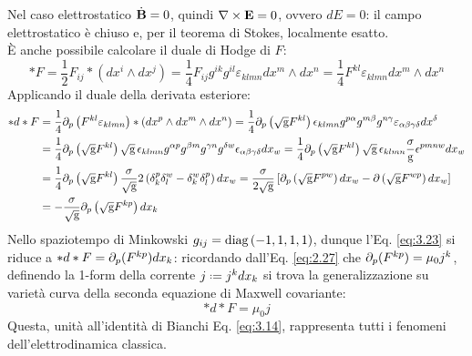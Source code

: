 Nel caso elettrostatico $ \dot{\mathbf{B}} = 0 $, quindi $ \nabla\times\mathbf{E} = 0 $, ovvero $ dE = 0 $: il campo elettrostatico è chiuso e, per il teorema di Stokes, localmente esatto.\\
È anche possibile calcolare il duale di Hodge di $ F $:
\begin{equation}
	*F = \frac{1}{2}F_{ij} * \left( dx^i \wedge dx^j \right) = \frac{1}{4} F_{ij} g^{ik} g^{il} \varepsilon_{klmn} dx^m \wedge dx^n = \frac{1}{4} F^{kl} \varepsilon_{klmn} dx^m \wedge dx^n
	\label{eq:3.22}
\end{equation}
Applicando il duale della derivata esteriore:
\begin{equation}
	\begin{split}
		*d*F &= \frac{1}{4} \partial_p \left( F^{kl} \varepsilon_{klmn} \right) * \left( dx^p \wedge dx^m \wedge dx^n \right) = \frac{1}{4} \partial_p \left( \sqrt{\mathbf{\text{g}}} F^{kl} \right) \epsilon_{klmn} g^{p\alpha} g^{m\beta} g^{n\gamma} \varepsilon_{\alpha\beta\gamma\delta} dx^{\delta}\\
		     &= \frac{1}{4} \partial_p \left( \sqrt{\mathbf{\text{g}}} F^{kl} \right) \sqrt{\mathbf{\text{g}}} \, \epsilon_{klmn} g^{\alpha p} g^{\beta m} g^{\gamma n} g^{\delta w} \epsilon_{\alpha\beta\gamma\delta} dx_w = \frac{1}{4} \partial_p \left( \sqrt{\mathbf{\text{g}}} F^{kl} \right) \sqrt{\mathbf{\text{g}}}\, \epsilon_{klmn} \frac{\sigma}{\mathbf{\text{g}}} \epsilon^{pmnw} dx_w\\
		     &= \frac{1}{4} \partial_p \left( \sqrt{\mathbf{\text{g}}} F^{kl} \right) \frac{\sigma}{\sqrt{\mathbf{\text{g}}}} 2 \left( \delta^p_k \delta^w_l - \delta^w_k \delta^p_l \right) dx_w = \frac{\sigma}{2\sqrt{\mathbf{\text{g}}}} \left[ \partial_p \left( \sqrt{\mathbf{\text{g}}} F^{pw} \right) dx_w - \partial \left( \sqrt{\mathbf{\text{g}}} F^{wp} \right) dx_w \right]\\
		     &= - \frac{\sigma}{\sqrt{\mathbf{\text{g}}}} \partial_p \left( \sqrt{\mathbf{\text{g}}} F^{kp} \right) dx_k
	\end{split}
	\label{eq:3.23}
\end{equation}
Nello spaziotempo di Minkowski $ g_{ij} = \text{diag}\,(-1,1,1,1) $, dunque l'Eq. \ref{eq:3.23} si riduce a $ *d*F = \partial_p (F^{kp}) dx_k $: ricordando dall'Eq. \ref{eq:2.27} che $ \partial_p (F^{kp}) = \mu_0 j^k $, definendo la 1-form della corrente $ j \defeq j^k dx_k $ si trova la generalizzazione su varietà curva della seconda equazione di Maxwell covariante:
\begin{equation}
	*d*F = \mu_0 j
	\label{eq:3.24}
\end{equation}
Questa, unità all'identità di Bianchi Eq. \ref{eq:3.14}, rappresenta tutti i fenomeni dell'elettrodinamica classica.










